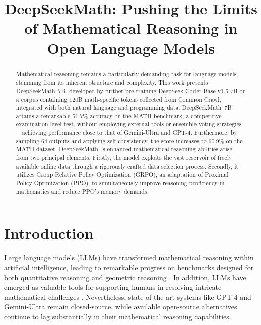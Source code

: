 \title{DeepSeekMath: Pushing the Limits of Mathematical Reasoning in Open Language Models}

\begin{abstract}
Mathematical reasoning remains a particularly demanding task for language models, stemming from its inherent structure and complexity. This work presents DeepSeekMath~7B, developed by further pre-training DeepSeek-Coder-Base-v1.5 7B on a corpus containing 120B math-specific tokens collected from Common Crawl, integrated with both natural language and programming data. DeepSeekMath~7B attains a remarkable 51.7\% accuracy on the MATH benchmark, a competitive examination-level test, without employing external tools or ensemble voting strategies—achieving performance close to that of Gemini-Ultra and GPT-4. Furthermore, by sampling 64 outputs and applying self-consistency, the score increases to 60.9\% on the MATH dataset. DeepSeekMath~’s enhanced mathematical reasoning abilities arise from two principal elements: Firstly, the model exploits the vast reservoir of freely available online data through a rigorously crafted data selection process. Secondly, it utilizes Group Relative Policy Optimization (GRPO), an adaptation of Proximal Policy Optimization (PPO), to simultaneously improve reasoning proficiency in mathematics and reduce PPO’s memory demands.
\end{abstract}

\section{Introduction}

Large language models (LLMs) have transformed mathematical reasoning within artificial intelligence, leading to remarkable progress on benchmarks designed for both quantitative reasoning \citep{MATH} and geometric reasoning \citep{trinh2024solving}. In addition, LLMs have emerged as valuable tools for supporting humans in resolving intricate mathematical challenges \citep{tao}. Nevertheless, state-of-the-art systems like GPT-4 \citep{gpt4} and Gemini-Ultra \citep{gemini} remain closed-source, while available open-source alternatives continue to lag substantially in their mathematical reasoning capabilities.

